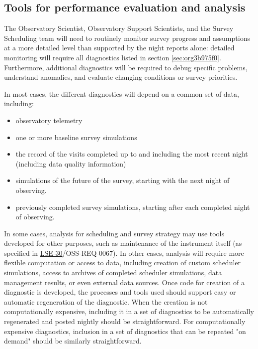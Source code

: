 \subsection{Tools for performance evaluation and analysis}
\label{sec:orgae0addb}
The Observatory Scientist, Observatory Support Scientists, and the Survey Scheduling team will need to routinely monitor survey progress and assumptions at a more detailed level than supported by the night reports alone:
detailed monitoring will require all diagnostics listed in section \ref{sec:org3b975f0}.
Furthermore, additional diagnostics will be required to debug specific problems, understand anomalies, and evaluate changing conditions or survey priorities.

In most cases, the different diagnostics will depend on a common set of data, including:
\begin{itemize}
\item observatory telemetry
\item one or more baseline survey simulations
\item the record of the visits completed up to and including the most recent night (including data quality information)
\item simulations of the future of the survey, starting with the next night of observing.
\item previously completed survey simulations, starting after each completed night of observing.
\end{itemize}

In some cases, analysis for scheduling and survey strategy may use tools developed for other purposes, such as maintenance of the instrument itself (as specified in \href{https://ls.st/lse-30}{LSE-30}/OSS-REQ-0067).
In other cases, analysis will require more flexible computation or access to data, including creation of custom scheduler simulations, access to archives of completed scheduler simulations, data management results, or even external data sources.
Once code for creation of a diagnostic is developed, the processes and tools used should support easy or automatic regeneration of the diagnostic.
When the creation is not computationally expensive, including it in a set of diagnostics to be automatically regenerated and posted nightly should be straightforward.
For computationally expensive diagnostics, inclusion in a set of diagnostics that can be repeated "on demand" should be similarly straightforward.

